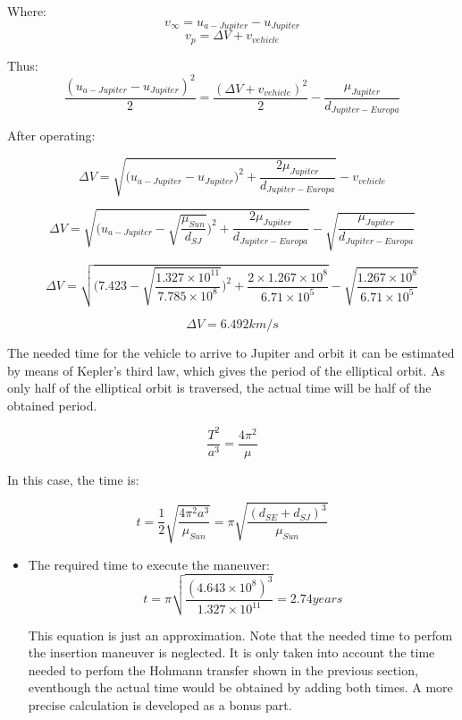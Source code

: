                 Where:
                $$v_{\infty}=u_{a-Jupiter}-u_{Jupiter}$$
                $$v_p=\Delta{V}+v_{vehicle}$$
                
 Thus: $$\frac{(u_{a-Jupiter}-u_{Jupiter})^2}{2}=\frac{(\Delta{V}+v_{vehicle})^2}{2}-\frac{\mu_{Jupiter}}{d_{Jupiter-Europa}}$$
 
 After operating:
               
               $$\Delta{V}=\sqrt{\Big(u_{a-Jupiter}-u_{Jupiter}\Big)^2+\frac{2\mu_{Jupiter}}{d_{Jupiter-Europa}}}-v_{vehicle}$$

\begin{equation}\label{eq:insertion}
\Delta{V}=\sqrt{\Big(u_{a-Jupiter}-\sqrt{\frac{\mu_{Sun}}{d_{SJ}}}\Big)^2+\frac{2\mu_{Jupiter}}{d_{Jupiter-Europa}}}-\sqrt{\frac{\mu_{Jupiter}}{d_{Jupiter-Europa}}}
\end{equation}

          
          {$$\Delta{V}=\sqrt{\Bigg(7.423 - \sqrt{\frac{1.327\times10^{11}}{7.785\times10^{8}}}\Bigg)^2+\frac{2\times1.267\times10^{8}}{6.71\times10^{5}}}-\sqrt{\frac{1.267\times10^{8}}{6.71\times10^{5}}}$$}
          
          $$\Delta{V} = 6.492 km/s$$
         
The needed time for the vehicle to arrive to Jupiter and orbit it can be estimated by means of Kepler's third law, which gives the period of the elliptical orbit. As only half of the elliptical orbit is traversed, the actual time will be half of the obtained period.

\begin{equation}
\frac{T^2}{a^3}=\frac{4\pi^2}{\mu}
\end{equation}

In this case, the time is:

$$t=\frac{1}{2}\sqrt{\frac{4\pi^2a^3}{\mu_{Sun}}}=\pi\sqrt{\frac{\left(d_{SE}+d_{SJ}\right)^3}{\mu_{Sun}}}$$
\begin{itemize}

\item The required time to execute the maneuver:
$$t=\pi\sqrt{\frac{\left(4.643\times10^{8}\right)^3}{1.327\times10^{11}}}= 2.74 years $$

This equation is just an approximation. Note that the needed time to perfom the insertion maneuver is neglected. It is only taken into account the time needed to perfom the Hohmann transfer shown in the previous section, eventhough the actual time would be obtained by adding both times. A more precise calculation is developed as a bonus part.

\end{itemize}


